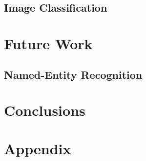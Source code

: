 \documentclass{article}
\numberwithin{equation}{section}
\begin{document}
\subsection{Image Classification}

\newpage
\section{Future Work}
\subsection{Named-Entity Recognition}

\newpage
\section{Conclusions}

\newpage



\newpage
\appendix
\section{Appendix}
\end{document}
